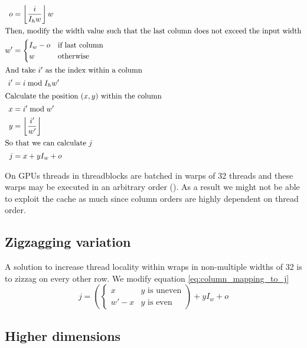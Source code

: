 \begin{align}
    o  &= \left\lfloor \frac{i}{I_h w} \right\rfloor w
    \\ \intertext{Then, modify the width value such that the last column does not exceed the input width}
    w' &= \begin{cases}
        I_w - o& \text{if last column}
        \\
        w & \text{otherwise}
    \end{cases}
    \\ \intertext{And take $i'$ as the index within a column}
    i' &= i \bmod I_h w'
    \\ \intertext{Calculate the position $(x, y)$ within the column}
    x & = i' \bmod w'
    \\ 
    y & = \left\lfloor \frac{i'}{w'} \right\rfloor
    \\ \intertext{So that we can calculate $j$}
    \label{eq:column_mapping_to_j}
    j  &= x + y I_w + o
\end{align}


On GPUs threads in threadblocks are batched in warps of 32 threads and these warps may be executed in an arbitrary order ().
As a result we might not be able to exploit the cache as much since column orders are highly dependent on thread order.

\subsection{Zigzagging variation}

A solution to increase thread locality within wraps in non-multiple widths of 32 is to zizzag on every other row.
We modify equation \ref{eq:column_mapping_to_j}
\begin{equation}
    j = \left(\begin{cases}
        x & y \text{ is uneven}
        \\
        w' - x & y \text{ is even}
    \end{cases}\right)  + y I_w + o
\end{equation}


\subsection{Higher dimensions}

